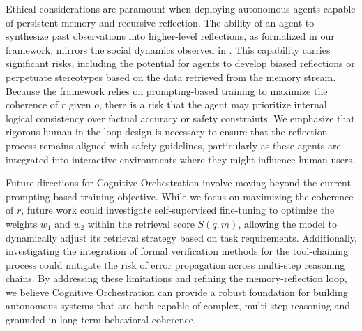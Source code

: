 \documentclass[11pt,a4paper]{article}
\begin{document}
Ethical considerations are paramount when deploying autonomous agents capable of persistent memory and recursive reflection. The ability of an agent to synthesize past observations into higher-level reflections, as formalized in our framework, mirrors the social dynamics observed in \cite{park2023}. This capability carries significant risks, including the potential for agents to develop biased reflections or perpetuate stereotypes based on the data retrieved from the memory stream. Because the framework relies on prompting-based training to maximize the coherence of $r$ given $o$, there is a risk that the agent may prioritize internal logical consistency over factual accuracy or safety constraints. We emphasize that rigorous human-in-the-loop design is necessary to ensure that the reflection process remains aligned with safety guidelines, particularly as these agents are integrated into interactive environments where they might influence human users.

Future directions for Cognitive Orchestration involve moving beyond the current prompting-based training objective. While we focus on maximizing the coherence of $r$, future work could investigate self-supervised fine-tuning to optimize the weights $w_1$ and $w_2$ within the retrieval score $S(q, m)$, allowing the model to dynamically adjust its retrieval strategy based on task requirements. Additionally, investigating the integration of formal verification methods for the tool-chaining process could mitigate the risk of error propagation across multi-step reasoning chains. By addressing these limitations and refining the memory-reflection loop, we believe Cognitive Orchestration can provide a robust foundation for building autonomous systems that are both capable of complex, multi-step reasoning and grounded in long-term behavioral coherence.



\end{document}
